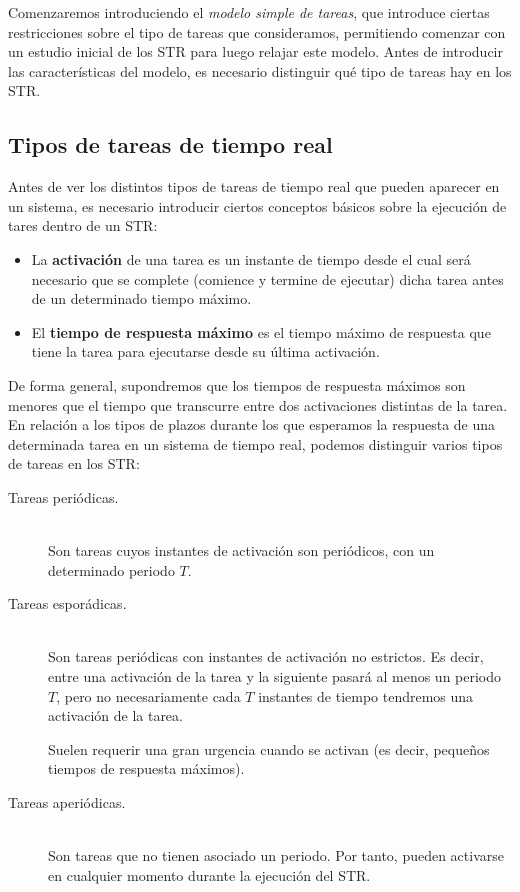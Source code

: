 Comenzaremos introduciendo el \textit{modelo simple de tareas}, que introduce ciertas restricciones sobre el tipo de tareas que consideramos, permitiendo comenzar con un estudio inicial de los STR para luego relajar este modelo. Antes de introducir las características del modelo, es necesario distinguir qué tipo de tareas hay en los STR\@.

\subsection{Tipos de tareas de tiempo real}
Antes de ver los distintos tipos de tareas de tiempo real que pueden aparecer en un sistema, es necesario introducir ciertos conceptos básicos sobre la ejecución de tares dentro de un STR\@:
\begin{itemize}
    \item La \textbf{activación} de una tarea es un instante de tiempo desde el cual será necesario que se complete (comience y termine de ejecutar) dicha tarea antes de un determinado tiempo máximo.
    \item El \textbf{tiempo de respuesta máximo} es el tiempo máximo de respuesta que tiene la tarea para ejecutarse desde su última activación.
\end{itemize}
De forma general, supondremos que los tiempos de respuesta máximos son menores que el tiempo que transcurre entre dos activaciones distintas de la tarea.\\

En relación a los tipos de plazos durante los que esperamos la respuesta de una determinada tarea en un sistema de tiempo real, podemos distinguir varios tipos de tareas en los STR\@:
\begin{description}
    \item [Tareas periódicas.]~\\
        Son tareas cuyos instantes de activación son periódicos, con un determinado periodo $T$.
    \item [Tareas esporádicas.]~\\
        Son tareas periódicas con instantes de activación no estrictos. Es decir, entre una activación de la tarea y la siguiente pasará al menos un periodo $T$, pero no necesariamente cada $T$ instantes de tiempo tendremos una activación de la tarea.

        Suelen requerir una gran urgencia cuando se activan (es decir, pequeños tiempos de respuesta máximos).
        \item [Tareas aperiódicas.]~\\
            Son tareas que no tienen asociado un periodo. Por tanto, pueden activarse en cualquier momento durante la ejecución del STR\@.
\end{description}

